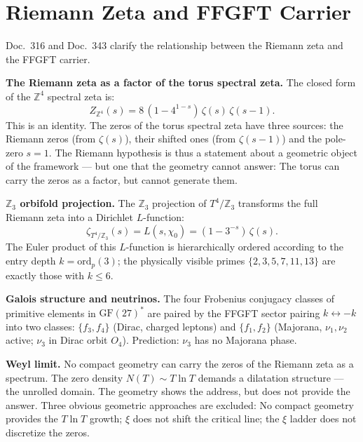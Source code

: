 \section{Riemann Zeta and FFGFT Carrier}

Doc.~316 and Doc.~343 clarify the relationship between the Riemann zeta
and the FFGFT carrier.

\textbf{The Riemann zeta as a factor of the torus spectral zeta.}
The closed form of the $\mathbb{Z}^4$ spectral zeta is:
\begin{equation}
  Z_{\mathbb{Z}^4}(s) = 8\,(1-4^{1-s})\,\zeta(s)\,\zeta(s-1).
\end{equation}
This is an identity. The zeros of the torus spectral zeta have
three sources: the Riemann zeros (from $\zeta(s)$), their shifted ones (from $\zeta(s-1)$) and the pole-zero $s = 1$. The
Riemann hypothesis is thus a statement about a geometric object
of the framework --- but one that the geometry cannot answer:
The torus can carry the zeros as a factor, but cannot generate them.

\textbf{$\mathbb{Z}_3$ orbifold projection.} The
$\mathbb{Z}_3$ projection of $T^4/\mathbb{Z}_3$ transforms the full
Riemann zeta into a Dirichlet $L$-function:
\begin{equation}
  \zeta_{T^4/\mathbb{Z}_3}(s) = L(s,\chi_0) = (1-3^{-s})\,\zeta(s).
\end{equation}
The Euler product of this $L$-function is hierarchically ordered according to the entry depth
$k = \mathrm{ord}_p(3)$; the physically
visible primes $\{2,3,5,7,11,13\}$ are exactly those with $k\le6$.

\textbf{Galois structure and neutrinos.} The four
Frobenius conjugacy classes of primitive elements in $\mathrm{GF}(27)^*$
are paired by the FFGFT sector pairing $k\leftrightarrow-k$ into two classes:
$\{f_3,f_4\}$ (Dirac, charged leptons) and $\{f_1,f_2\}$
(Majorana, $\nu_1,\nu_2$ active; $\nu_3$ in Dirac orbit $O_4$). Prediction:
$\nu_3$ has no Majorana phase.

\textbf{Weyl limit.} No compact geometry can
carry the zeros of the Riemann zeta as a spectrum. The zero density
$N(T)\sim T\ln T$ demands a dilatation structure --- the unrolled
domain. The geometry shows the address, but does not provide the answer.
Three obvious geometric approaches are excluded: No
compact geometry provides the $T\ln T$ growth; $\xi$ does not shift the
critical line; the $\xi$ ladder does not discretize the zeros.

